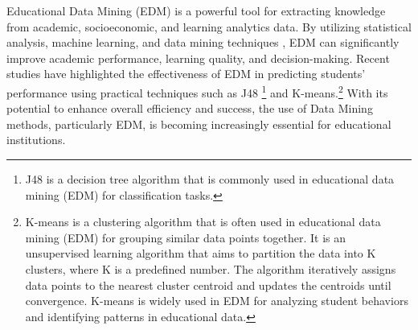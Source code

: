 Educational Data Mining (EDM) is a powerful tool for extracting knowledge from academic, socioeconomic, and 
learning analytics data. By utilizing statistical analysis, machine learning, and data mining techniques \citep{hooda_integrating_2022, arifin_using_2022},
EDM can significantly improve academic performance, learning quality, and decision-making. Recent studies have 
highlighted the effectiveness of EDM in predicting students' performance using practical techniques such as J48 \footnote{J48 is a decision tree algorithm that is commonly used in 
educational data mining (EDM) for classification tasks.} and K-means.\footnote{ K-means is a clustering algorithm that is often used in educational data mining 
(EDM) for grouping similar data points together. It is an unsupervised learning algorithm that aims to partition the data into K clusters, where K is a predefined number. 
The algorithm iteratively assigns data points to the nearest cluster centroid and updates the centroids until convergence. 
K-means is widely used in EDM for analyzing student behaviors and identifying patterns in educational data.}
With its potential to enhance overall efficiency and success\citep{prince_sattam_bin_abdulaziz_university_state_2016},
the use of Data Mining methods, particularly EDM, is becoming increasingly essential for educational institutions.


